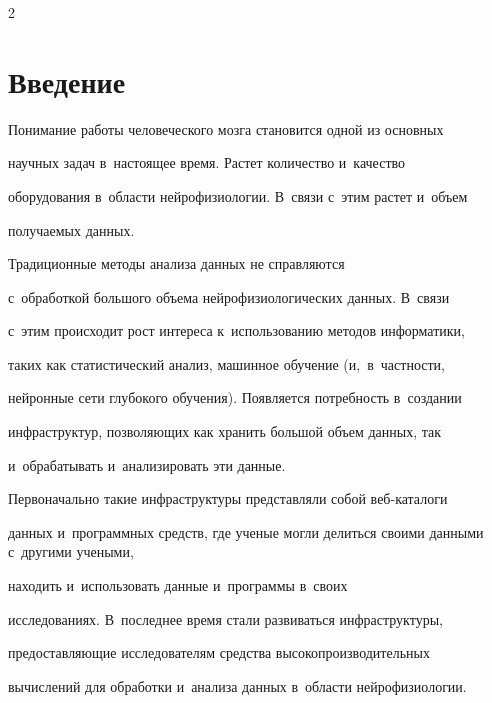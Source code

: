 \begin{multicols}{2}



\label{st\stat}



\section{Введение}






    Понимание работы человеческого мозга становится одной из основных 

научных задач в~на\-сто\-ящее время. Рас\-тет количество и~качество 

оборудования в~области нейрофизиологии. В~связи с~этим растет и~объем 

получаемых данных. 



Традиционные методы анализа данных не справляются 

с~обработкой большого объема нейрофизиологических данных. В~связи 

с~этим происходит рост интереса к~использованию методов информатики, 

таких как статистический анализ, машинное обуче\-ние (и,~в~част\-ности, 

нейронные сети глубокого обуче\-ния). Появляется потребность в~создании 

инфраструктур, позволяющих как хранить большой объем данных, так 

и~обрабатывать и~анализировать эти данные.

    

    Первоначально такие инфраструктуры пред\-став\-ля\-ли собой веб-ка\-та\-ло\-ги 

данных и~программных средств, где ученые могли делиться своими данными с~другими учеными, 

находить и~использовать данные и~программы в~своих 

исследованиях. В~последнее время стали развиваться инфраструктуры, 

предоставляющие исследователям средства высокопроизводительных 

вычислений для обработки и~анализа данных в~области нейрофизиологии. 



    


\end{multicols}
